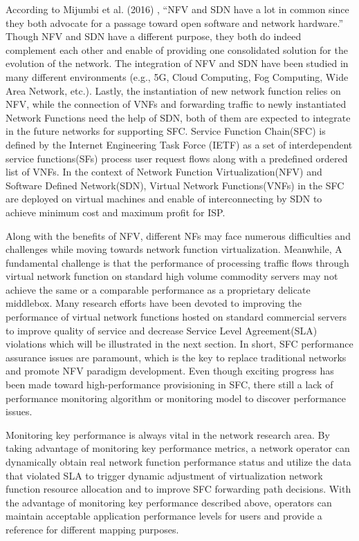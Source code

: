 \documentclass{ieeeaccess}
\begin{document}
According to Mijumbi et al. (2016) \cite{b7}, ``NFV and SDN have a lot in common since they both advocate for a passage toward open software and network hardware.'' Though NFV and SDN have a different purpose, they both do indeed complement each other and enable of providing one consolidated solution for the evolution of the network. The integration of NFV and SDN have been studied in many different environments (e.g., 5G, Cloud Computing, Fog Computing, Wide Area Network, etc.). Lastly, the instantiation of new network function relies on NFV, while the connection of VNFs and forwarding traffic to newly instantiated Network Functions need the help of SDN, both of them are expected to integrate in the future networks for supporting SFC. Service Function Chain(SFC)\cite{b9} is defined by the Internet Engineering Task Force (IETF) as a set of interdependent service functions(SFs) process user request flows along with a predefined ordered list of VNFs. In the context of Network Function Virtualization(NFV) and Software Defined Network(SDN), Virtual Network Functions(VNFs) in the SFC are deployed on virtual machines and enable of interconnecting by SDN to achieve minimum cost and maximum profit for ISP.

Along with the benefits of NFV, different NFs may face numerous difficulties and challenges while moving towards network function virtualization. Meanwhile, A fundamental challenge is that the performance of processing traffic flows through virtual network function on standard high volume commodity servers may not achieve the same or a comparable performance as a proprietary delicate middlebox. Many research efforts have been devoted to improving the performance of virtual network functions hosted on standard commercial servers to improve quality of service and decrease Service Level Agreement(SLA) violations which will be illustrated in the next section. In short, SFC performance assurance issues are paramount, which is the key to replace traditional networks and promote NFV paradigm development. Even though exciting progress has been made toward high-performance provisioning in SFC, there still a lack of performance monitoring algorithm or monitoring model to discover performance issues.

Monitoring key performance is always vital in the network research area. By taking advantage of monitoring key performance metrics, a network operator can dynamically obtain real network function performance status and utilize  the data that violated SLA to trigger dynamic adjustment of virtualization network function resource allocation and to improve SFC forwarding path decisions. With the advantage of monitoring key performance described above, operators can maintain acceptable application performance levels for users and provide a reference for different mapping purposes.
\end{document}
